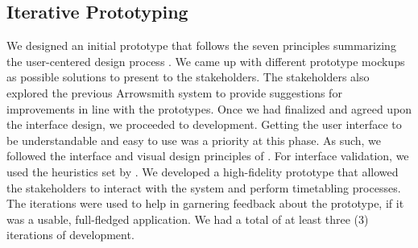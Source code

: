 \subsection{Iterative Prototyping}
We designed an initial prototype that follows the seven principles summarizing the user-centered design process \cite{Norman:2002:DET:2187809}. We came up with different prototype mockups as possible solutions to present to the stakeholders. The stakeholders also explored the previous Arrowsmith system to provide suggestions for improvements in line with the prototypes. Once we had finalized and agreed upon the interface design, we proceeded to development. Getting the user interface to be understandable and easy to use was a priority at this phase. As such, we followed the interface and visual design principles of \cite{Soper2016, Gong2009, Thimbleby}. For interface validation, we used the heuristics set by \cite{Paz}. We developed a high-fidelity prototype that allowed the stakeholders to interact with the system and perform timetabling processes. The iterations were used to help in garnering feedback about the prototype, if it was a usable, full-fledged application. We had a total of at least three (3) iterations of development.

